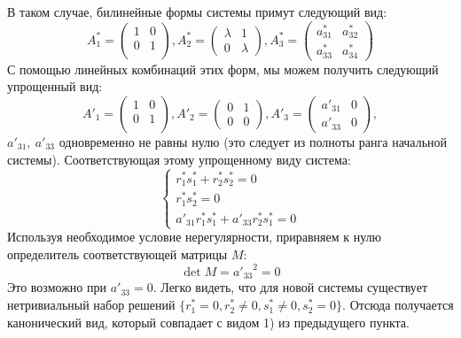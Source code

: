 В таком случае, билинейные формы системы примут следующий вид:
\begin{equation}\label{eq:equal_raw}
	A^*_1 = 
	\begin{pmatrix}
		1 & 0 \\
		0 & 1 \\
	\end{pmatrix}, 
	A^*_2 = 
	\begin{pmatrix}
		\lambda & 1 \\
		0 & \lambda
 	\end{pmatrix},
	A^*_3 = 
	\begin{pmatrix}
		a^*_{31} & a^*_{32} \\
		a^*_{33} & a^*_{34}
	\end{pmatrix}
\end{equation}
С помощью линейных комбинаций этих форм, мы можем получить следующий упрощенный вид: 
\begin{equation}
	A'_1 = 
	\begin{pmatrix}
		1 & 0 \\
		0 & 1 \\
	\end{pmatrix}, 
	A'_2 = 
	\begin{pmatrix}
		0 & 1 \\
		0 & 0
 	\end{pmatrix},
	A'_3 = 
	\begin{pmatrix}
		a'_{31} & 0 \\
		a'_{33} & 0
	\end{pmatrix},
\end{equation}
$a'_{31},~a'_{33}$ одновременно не равны нулю (это следует из полноты ранга начальной 
системы).
Соответствующая этому упрощенному виду система: 
\begin{equation}
	\begin{cases}
		r^*_1s^*_1 + r^*_2s^*_2 = 0 \\
		r^*_1s^*_2 = 0 \\
		a'_{31}r^*_1s^*_1 + a'_{33}r^*_2s^*_1 = 0
	\end{cases}
\end{equation} 
Используя необходимое условие нерегулярности, приравняем к нулю определитель соответствующей матрицы $M$: 
$$
	\det M = {a'_{33}}^2 = 0 
$$
Это возможно при $a'_{33} = 0$. Легко видеть, что для новой системы существует нетривиальный 
набор решений $\{r^*_1 = 0, r^*_2 \ne 0, s^*_1 \ne 0, s^*_2 = 0\}$. Отсюда получается 
канонический вид, который совпадает с видом 1) из предыдущего пункта.  

